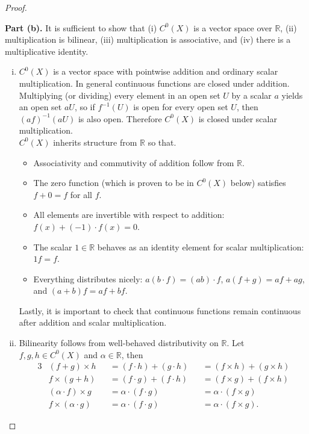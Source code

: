 \documentclass{article}
\newenvironment{problempart}[1]{\begin{trivlist}\item[\textbf{Part #1.}]}{\end{trivlist}}
\begin{document}
\begin{proof}
\begin{problempart}{(b)}
  It is sufficient to show that
  (i) $C^0(X)$ is a vector space over $\mathbb{R}$,
  (ii) multiplication is bilinear,
  (iii) multiplication is associative, and
  (iv) there is a multiplicative identity.
  \begin{enumerate}[(i)]
    \item $C^0(X)$ is a vector space with pointwise addition and ordinary scalar
      multiplication. In general continuous functions are closed under addition.
      Multiplying (or dividing) every element in an open set $U$ by a scalar $a$
      yields an open set $aU$,
      so if $f^{-1}(U)$ is open for every open set $U$,
      then $(af)^{-1}(aU)$ is also open.
      Therefore $C^0(X)$ is closed under scalar multiplication.\\
      $C^0(X)$ inherits structure from $\mathbb{R}$ so that.
      \begin{itemize}
        \item Associativity and commutivity of addition follow from $\mathbb{R}$.
        \item The zero function (which is proven to be in $C^0(X)$ below) satisfies $f + 0 = f$ for all $f$.
        \item All elements are invertible with respect to addition: $f(x) + (-1)\cdot f(x) = 0$.
        \item The scalar $1 \in \mathbb{R}$ behaves as an identity element for scalar multiplication: $1f = f$.
        \item Everything distributes nicely: $a(b \cdot f) = (ab) \cdot f$, $a(f + g) = af + ag$, and $(a + b)f = af + bf$.
      \end{itemize}
      Lastly, it is important to check that continuous functions remain
      continuous after addition and scalar multiplication.
    \item Bilinearity follows from well-behaved distributivity on $\mathbb{R}.$
      Let $f,g,h\in C^0(X)$ and $\alpha \in \mathbb{R}$, then
    \begin{alignat*}{3}
      &(f + g) \times h &&= (f \cdot h) + (g \cdot h) &&= (f \times h) + (g \times h)\\
      &f \times (g + h) &&= (f \cdot g) + (f \cdot h) &&= (f \times g) + (f \times h)\\
      &(\alpha \cdot f) \times g &&= \alpha \cdot (f \cdot g) &&= \alpha \cdot (f \times g) \\
      &f \times (\alpha \cdot g) &&= \alpha \cdot (f \cdot g) &&= \alpha \cdot (f \times g).

\end{alignat*}
\end{enumerate}
\end{problempart}
\end{proof}
\end{document}
